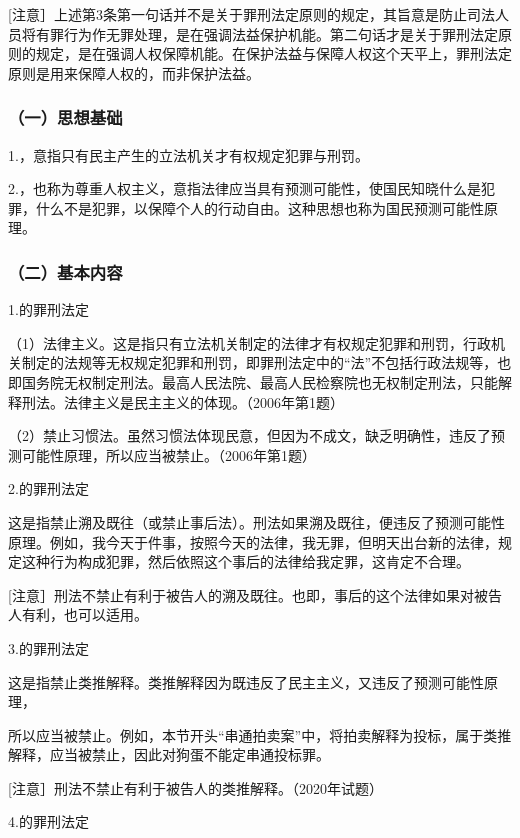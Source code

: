[注意］上述第3条第一句话并不是关于罪刑法定原则的规定，其旨意是防止司法人员将有罪行为作无罪处理，是在强调法益保护机能。第二句话才是关于罪刑法定原则的规定，是在强调人权保障机能。在保护法益与保障人权这个天平上，罪刑法定原则是用来保障人权的，而非保护法益。

\subsubsection*{（一）思想基础}

1.，意指只有民主产生的立法机关才有权规定犯罪与刑罚。

2.，也称为尊重人权主义，意指法律应当具有预测可能性，使国民知晓什么是犯罪，什么不是犯罪，以保障个人的行动自由。这种思想也称为国民预测可能性原理。

\subsubsection*{（二）基本内容}

1.的罪刑法定

（1）法律主义。这是指只有立法机关制定的法律才有权规定犯罪和刑罚，行政机关制定的法规等无权规定犯罪和刑罚，即罪刑法定中的“法”不包括行政法规等，也即国务院无权制定刑法。最高人民法院、最高人民检察院也无权制定刑法，只能解释刑法。法律主义是民主主义的体现。（2006年第1题）

（2）禁止习惯法。虽然习惯法体现民意，但因为不成文，缺乏明确性，违反了预测可能性原理，所以应当被禁止。（2006年第1题）

2.的罪刑法定

这是指禁止溯及既往（或禁止事后法）。刑法如果溯及既往，便违反了预测可能性原理。例如，我今天于件事，按照今天的法律，我无罪，但明天出台新的法律，规定这种行为构成犯罪，然后依照这个事后的法律给我定罪，这肯定不合理。

[注意］刑法不禁止有利于被告人的溯及既往。也即，事后的这个法律如果对被告人有利，也可以适用。

3.的罪刑法定

这是指禁止类推解释。类推解释因为既违反了民主主义，又违反了预测可能性原理，

所以应当被禁止。例如，本节开头“串通拍卖案”中，将拍卖解释为投标，属于类推解释，应当被禁止，因此对狗蛋不能定串通投标罪。

[注意］刑法不禁止有利于被告人的类推解释。（2020年试题）

4.的罪刑法定

